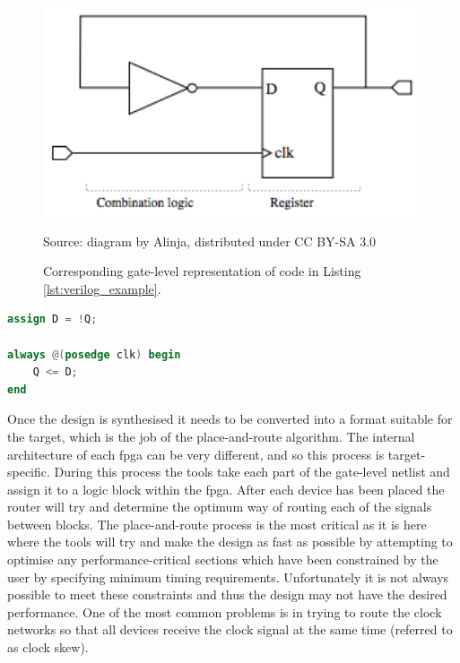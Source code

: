 \begin{figure}
  \centering
  \includegraphics[width=1\textwidth]{./img/gate_level.png}\par
Source: diagram by Alinja, distributed under CC BY-SA 3.0
  \caption{Corresponding gate-level representation of code in Listing \ref{lst:verilog_example}.}
  \label{fig:gate_level}
\end{figure}

\begin{lstlisting}[caption={A basic Verilog example of a register being fed with its own inverted output.}, label={lst:verilog_example}, language=Verilog]
assign D = !Q;

always @(posedge clk) begin
    Q <= D;
end
\end{lstlisting}

Once the design is synthesised it needs to be converted into a format suitable for the target, which is the job of the place-and-route algorithm. The internal architecture of each \gls{fpga} can be very different, and so this process is target-specific. During this process the tools take each part of the gate-level netlist and assign it to a logic block within the \gls{fpga}. After each device has been placed the router will try and determine the optimum way of routing each of the signals between blocks. The place-and-route process is the most critical as it is here where the tools will try and make the design as fast as possible by attempting to optimise any performance-critical sections which have been constrained by the user by specifying minimum timing requirements. Unfortunately it is not always possible to meet these constraints and thus the design may not have the desired performance. One of the most common problems is in trying to route the clock networks so that all devices receive the clock signal at the same time (referred to as clock skew).

